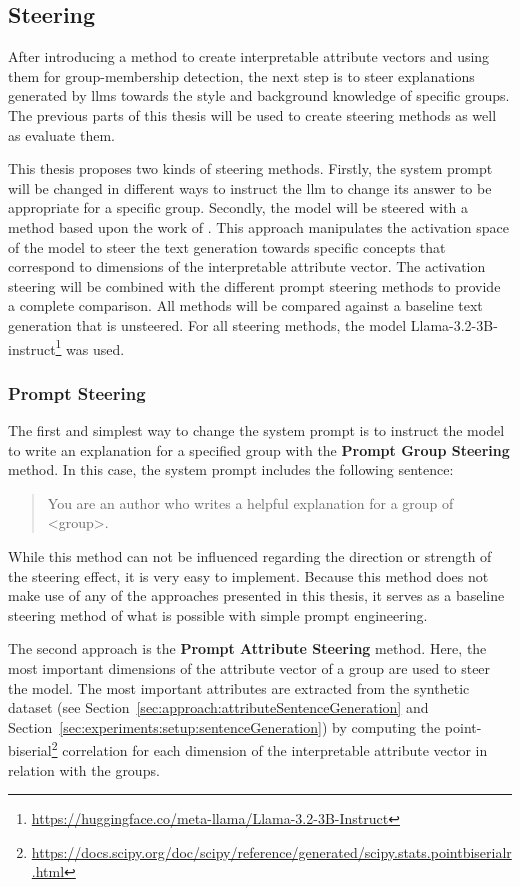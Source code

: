 \subsection{Steering}
\label{sec:experiments:setup:steering}
After introducing a method to create interpretable attribute vectors and using them for group-membership detection, the next step is to steer explanations generated by \aclp{llm} towards the style and background knowledge of specific groups. The previous parts of this thesis will be used to create steering methods as well as evaluate them.

This thesis proposes two kinds of steering methods. Firstly, the system prompt will be changed in different ways to instruct the \ac{llm} to change its answer to be appropriate for a specific group. Secondly, the model will be steered with a method based upon the work of \citet{konenStyleVectorsSteering2024,turnerActivationAdditionSteering2024,rimsky-etal-2024-steering}. This approach manipulates the activation space of the model to steer the text generation towards specific concepts that correspond to dimensions of the interpretable attribute vector. The activation steering will be combined with the different prompt steering methods to provide a complete comparison.
All methods will be compared against a baseline text generation that is unsteered.
For all steering methods, the model Llama-3.2-3B-instruct\footnote{\url{https://huggingface.co/meta-llama/Llama-3.2-3B-Instruct}} was used.

\subsubsection{Prompt Steering}
\label{sec:experiments:setup:steering:prompt}
The first and simplest way to change the system prompt is to instruct the model to write an explanation for a specified group with the \textbf{Prompt Group Steering} method. In this case, the system prompt includes the following sentence:
\begin{quote} %
  You are an author who writes a helpful explanation for a group of <group>.
\end{quote}
While this method can not be influenced regarding the direction or strength of the steering effect, it is very easy to implement. Because this method does not make use of any of the approaches presented in this thesis, it serves as a baseline steering method of what is possible with simple prompt engineering.

The second approach is the \textbf{Prompt Attribute Steering} method. Here, the most important dimensions of the attribute vector of a group are used to steer the model. The most important attributes are extracted from the synthetic dataset (see Section~\ref{sec:approach:attributeSentenceGeneration} and Section~\ref{sec:experiments:setup:sentenceGeneration}) by computing the point-biserial\footnote{\url{https://docs.scipy.org/doc/scipy/reference/generated/scipy.stats.pointbiserialr.html}} correlation for each dimension of the interpretable attribute vector in relation with the groups.

